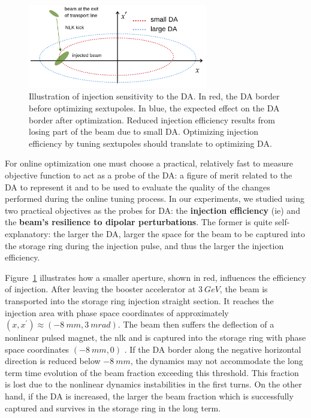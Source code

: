 \begin{figure}
    \centering
    \includegraphics[width=0.7\textwidth]{Images/injection_illustration.png}
    \caption[Illustration of injection sensitivity to the DA]{Illustration of injection sensitivity to the \gls*{DA}. In red, the \gls*{DA} border before optimizing sextupoles. In blue, the expected effect on the \gls*{DA} border after optimization. Reduced injection efficiency results from losing part of the beam due to small \gls*{DA}. Optimizing injection efficiency by tuning sextupoles should translate to optimizing \gls*{DA}.}
    \label{fig:injection_efficiency}
\end{figure}

For online optimization one must choose a practical, relatively fast to measure objective function to act as a probe of the \gls*{DA}: a figure of merit related to the \gls*{DA} to represent it and to be used to evaluate the quality of the changes performed during the online tuning process. In our experiments, we studied using two practical objectives as the probes for \gls*{DA}: the \textbf{injection efficiency} (\gls*{ie}) and the \textbf{beam's resilience to dipolar perturbations}. The former is quite self-explanatory: the larger the \gls*{DA}, larger the space for the beam to be captured into the storage ring during the injection pulse, and thus the larger the injection efficiency.

Figure~\ref{fig:injection_efficiency}  illustrates how a smaller aperture, shown in red, influences the efficiency of injection. After leaving the booster accelerator at $3~\unit{GeV}$, the beam is transported into the storage ring injection straight section. It reaches the injection area with phase space coordinates of approximately $(x, x^\prime)\approx(-8~\unit{mm}, 3~\unit{m rad})$. The beam then suffers the deflection of a nonlinear pulsed magnet, the \gls*{nlk} and is captured into the storage ring with phase space coordinates $(-8~ \unit{mm}, 0)$ \cite{liu_injection_2016}. If the \gls*{DA} border along the negative horizontal direction is reduced below $-8~\unit{mm}$, the dynamics may not accommodate the long term time evolution of the beam fraction exceeding this threshold. This fraction is lost due to the nonlinear dynamics instabilities in the first turns. On the other hand, if the \gls*{DA} is increased, the larger the beam fraction which is successfully captured and survives in the storage ring in the long term.

